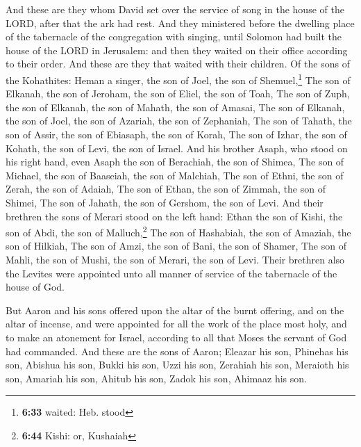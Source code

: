  And these are they whom David set over the service of
song in the house of the LORD, after that the ark had rest.
 And they ministered before the dwelling place of the
tabernacle of the congregation with singing, until Solomon had built the
house of the LORD in Jerusalem: and then they waited on their office
according to their order.  And these are they that waited
with their children. Of the sons of the Kohathites: Heman a singer, the
son of Joel, the son of Shemuel,\footnote{\textbf{6:33} waited: Heb.
  stood}  The son of Elkanah, the son of Jeroham, the son
of Eliel, the son of Toah,  The son of Zuph, the son of
Elkanah, the son of Mahath, the son of Amasai,  The son
of Elkanah, the son of Joel, the son of Azariah, the son of Zephaniah,
 The son of Tahath, the son of Assir, the son of
Ebiasaph, the son of Korah,  The son of Izhar, the son of
Kohath, the son of Levi, the son of Israel.  And his
brother Asaph, who stood on his right hand, even Asaph the son of
Berachiah, the son of Shimea,  The son of Michael, the
son of Baaseiah, the son of Malchiah,  The son of Ethni,
the son of Zerah, the son of Adaiah,  The son of Ethan,
the son of Zimmah, the son of Shimei,  The son of Jahath,
the son of Gershom, the son of Levi.  And their brethren
the sons of Merari stood on the left hand: Ethan the son of Kishi, the
son of Abdi, the son of Malluch,\footnote{\textbf{6:44} Kishi: or,
  Kushaiah}  The son of Hashabiah, the son of Amaziah,
the son of Hilkiah,  The son of Amzi, the son of Bani,
the son of Shamer,  The son of Mahli, the son of Mushi,
the son of Merari, the son of Levi.  Their brethren also
the Levites were appointed unto all manner of service of the tabernacle
of the house of God.

 But Aaron and his sons offered upon the altar of the
burnt offering, and on the altar of incense, and were appointed for all
the work of the place most holy, and to make an atonement for Israel,
according to all that Moses the servant of God had commanded.
 And these are the sons of Aaron; Eleazar his son,
Phinehas his son, Abishua his son,  Bukki his son, Uzzi
his son, Zerahiah his son,  Meraioth his son, Amariah his
son, Ahitub his son,  Zadok his son, Ahimaaz his son.

